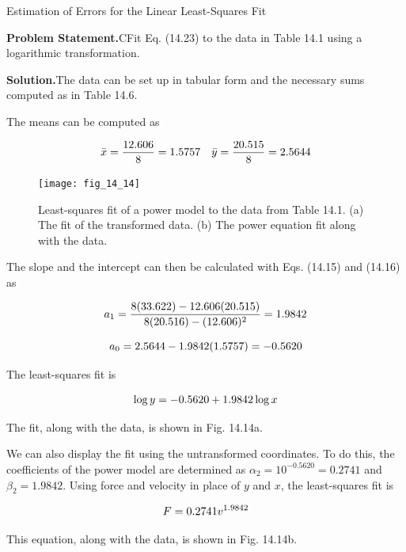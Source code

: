 \documentclass[../main.tex]{subfiles}
\begin{document}
\begin{example} Estimation of Errors for the Linear Least-Squares Fit

    \noindent\textbf{Problem Statement.}\quad CFit Eq. (14.23) to the data in Table 14.1 using a logarithmic transformation.

    \noindent\textbf{Solution.}\quad  The data can be set up in tabular form and the necessary sums computed as in Table 14.6.

	The means can be computed as
	
	\begin{equation}
		\notag
		\bar{x} = \frac{12.606}{8}=1.5757 \quad \bar{y} = \frac{20.515}{8} = 2.5644
	\end{equation}


	\begin{figure}[H]
		\centering
		\texttt{[image: fig\_14\_14]}
		\caption{\textsf{Least-squares fit of a power model to the data from Table 14.1. (a) The fit of the transformed data.
		(b) The power equation fit along with the data.}}
		\label{fig:fig_14_14}
	\end{figure}

	\noindent The slope and the intercept can then be calculated with Eqs. (14.15) and (14.16) as

	\begin{equation}
		\notag
		a_1 = \frac{8(33.622) - 12.606(20.515)}{8(20.516) - (12.606)^2} = 1.9842
	\end{equation}

	\begin{equation}
		\notag
		a_0 = 2.5644 - 1.9842(1.5757) = -0.5620
	\end{equation}

	\noindent The least-squares fit is

	\begin{equation}
		\notag
		\log y = -0.5620 + 1.9842 \log x
	\end{equation}

	\noindent The fit, along with the data, is shown in Fig. 14.14a.

	We can also display the fit using the untransformed coordinates. To do this, the coefficients of the power model are determined as $\alpha_2 = 10^{-0.5620} = 0.2741$ and $\beta_2 = 1.9842$. Using force and velocity in place of $y$ and $x$, the least-squares fit is

	\begin{equation}
		\notag
		F = 0.2741 v ^ {1.9842}		
	\end{equation}

	\noindent This equation, along with the data, is shown in Fig. 14.14b.
\end{example}
\end{document}
